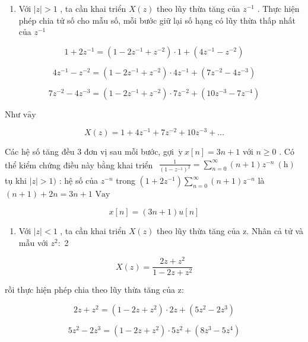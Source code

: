 \documentclass[
  10
]{article}
\providecommand{\tightlist}{%
  \setlength{\itemsep}{0pt}\setlength{\parskip}{0pt}}
\begin{document}
\begin{enumerate}
\def\labelenumi{\alph{enumi}.}
\tightlist
\item
  Với \(| z | > 1\) , ta cần khai triển \(X ( z )\) theo lũy thừa tăng
  của \(z ^ { - 1 }\) . Thực hiện phép chia tử số cho mẫu số, mỗi bước
  giữ lại số hạng có lũy thừa thấp nhất của \(z ^ { - 1 }\)
\end{enumerate}

\[
1 + 2 z ^ {- 1} = (1 - 2 z ^ {- 1} + z ^ {- 2}) \cdot 1 + (4 z ^ {- 1} - z ^ {- 2})
\]

\[
4 z ^ {- 1} - z ^ {- 2} = (1 - 2 z ^ {- 1} + z ^ {- 2}) \cdot 4 z ^ {- 1} + (7 z ^ {- 2} - 4 z ^ {- 3})
\]

\[
7 z ^ {- 2} - 4 z ^ {- 3} = (1 - 2 z ^ {- 1} + z ^ {- 2}) \cdot 7 z ^ {- 2} + (1 0 z ^ {- 3} - 7 z ^ {- 4})
\]

Như \(\mathrm { v } \mathrm { \hat { a } \mathrm { y } }\)

\[
X (z) = 1 + 4 z ^ {- 1} + 7 z ^ {- 2} + 1 0 z ^ {- 3} + \dots
\]

Các hệ số tăng đều 3 đơn vị sau mỗi bước, gợi
\(\acute { \mathrm { ~ y ~ } } x [ n ] = 3 n + 1\) với \(n \geq 0\) . Có
thể kiểm chứng điều này bằng khai triển
\(\begin{array} { r } { { \frac { 1 } { ( 1 - z ^ { - 1 } ) ^ { 2 } } } = \sum _ { n = 0 } ^ { \infty } ( n + 1 ) z ^ { - n } ~ \mathrm { ( h ) } } \end{array}\)
tụ khi \(| z | > 1 )\) : hệ số của \(z ^ { - n }\) trong
\(\textstyle ( 1 + 2 z ^ { - 1 } ) \sum _ { n = 0 } ^ { \infty } ( n + 1 ) z ^ { - n }\)
là \(( n + 1 ) + 2 n = 3 n + 1\) \(\mathrm { V a y }\)

\[
x [ n ] = (3 n + 1) u [ n ]
\]

\begin{enumerate}
\def\labelenumi{\alph{enumi}.}
\setcounter{enumi}{1}
\tightlist
\item
  Với \(| z | < 1\) , ta cần khai triển \(X ( z )\) theo lũy thừa tăng
  của z. Nhân cả tử và mẫu với \(z ^ { 2 } { \mathrm { : } }\) 2
\end{enumerate}

\[
X (z) = \frac {2 z + z ^ {2}}{1 - 2 z + z ^ {2}}
\]

rồi thực hiện phép chia theo lũy thừa tăng của z:

\[
2 z + z ^ {2} = (1 - 2 z + z ^ {2}) \cdot 2 z + (5 z ^ {2} - 2 z ^ {3})
\]

\[
5 z ^ {2} - 2 z ^ {3} = (1 - 2 z + z ^ {2}) \cdot 5 z ^ {2} + (8 z ^ {3} - 5 z ^ {4})
\]
\end{document}
